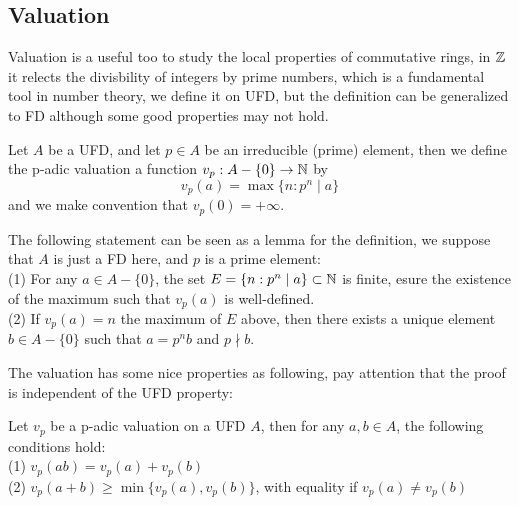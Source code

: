 \documentclass[12pt,a4paper]{article}
\begin{document}
\subsection*{Valuation}
Valuation is a useful too to study the local properties of commutative rings, in \(\mathbb{Z}\) it relects the divisbility of integers by prime numbers, which is a fundamental tool in number theory, we define it on UFD, but the definition can be generalized to FD although some good properties may not hold.
\begin{definitionplain}
    Let \(A\) be a UFD, and let \(p \in A\) be an irreducible (prime) element, then we define the p-adic valuation a function \(v_p:A-\{0\} \to \mathbb{N}\) by
    \[v_p(a) = \max \{n : p^n \mid a\}\]
    and we make convention that \(v_p(0) = +\infty\).
\end{definitionplain}

\begin{remark}
    The following statement can be seen as a lemma for the definition, we suppose that \(A\) is just a FD here, and \(p\) is a prime element:\\

    (1) For any \(a \in A-\{0\}\), the set \(E = \{n: p^n \mid a\} \subset \mathbb{N}\) is finite, esure the existence of the maximum such that \(v_p(a)\) is well-defined.\\

    (2) If \(v_p(a) = n\) the maximum of \(E\) above, then there exists a unique element \(b \in A-\{0\}\) such that \(a = p^n b\) and \(p \nmid b\).
\end{remark}

The valuation has some nice properties as following, pay attention that the proof is independent of the UFD property:
\begin{propositionplain}
    Let \(v_p\) be a p-adic valuation on a UFD \(A\), then for any \(a,b \in A\), the following conditions hold:\\
    (1) \(v_p(ab) = v_p(a) + v_p(b)\)\\
    (2) \(v_p(a+b) \geq \min\{v_p(a), v_p(b)\}\), with equality if \(v_p(a) \neq v_p(b)\)\\
\end{propositionplain}
\end{document}
